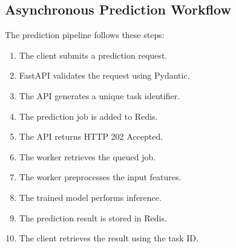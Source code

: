 \documentclass[11pt,a4paper]{article}
\begin{document}
\begin{center}
\end{center}

\subsection{Asynchronous Prediction Workflow}

The prediction pipeline follows these steps:

\begin{enumerate}
    \item The client submits a prediction request.
    \item FastAPI validates the request using Pydantic.
    \item The API generates a unique task identifier.
    \item The prediction job is added to Redis.
    \item The API returns HTTP 202 Accepted.
    \item The worker retrieves the queued job.
    \item The worker preprocesses the input features.
    \item The trained model performs inference.
    \item The prediction result is stored in Redis.
    \item The client retrieves the result using the task ID.
\end{enumerate}
\end{document}

